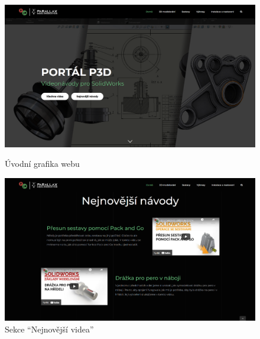 \begin{figure}[tp]
    \centering
    \begin{minipage}[b]{0.45\textwidth}
        \centering
        \includegraphics[width=1\textwidth]{img/020/web/web-hp1.png}
        \caption{Úvodní grafika webu}
        \label{fig:p3dportal-hp1}
    \end{minipage}
    \qquad
    \begin{minipage}[b]{0.45\textwidth}
        \centering
        \includegraphics[width=1\textwidth]{img/020/web/web-hp2.png}
        \caption{Sekce \enquote{Nejnovější videa}}
        \label{fig:p3dportal-hp2}
    \end{minipage}
\end{figure}


